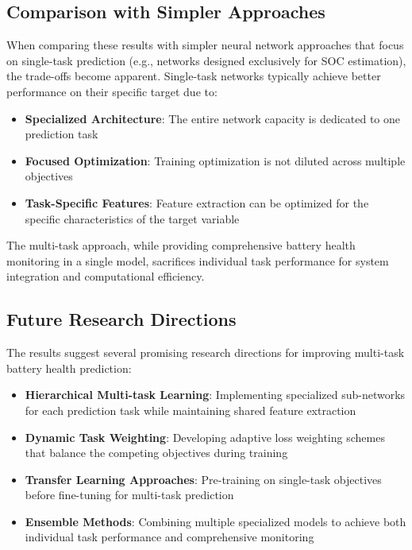 \subsection{Comparison with Simpler Approaches}
\label{subsec:comparison_simpler}

When comparing these results with simpler neural network approaches that focus on single-task prediction (e.g., networks designed exclusively for SOC estimation), the trade-offs become apparent. Single-task networks typically achieve better performance on their specific target due to:

\begin{itemize}
    \item \textbf{Specialized Architecture}: The entire network capacity is dedicated to one prediction task
    \item \textbf{Focused Optimization}: Training optimization is not diluted across multiple objectives
    \item \textbf{Task-Specific Features}: Feature extraction can be optimized for the specific characteristics of the target variable
\end{itemize}

The multi-task approach, while providing comprehensive battery health monitoring in a single model, sacrifices individual task performance for system integration and computational efficiency.

\subsection{Future Research Directions}
\label{subsec:future_directions}

The results suggest several promising research directions for improving multi-task battery health prediction:

\begin{itemize}
    \item \textbf{Hierarchical Multi-task Learning}: Implementing specialized sub-networks for each prediction task while maintaining shared feature extraction
    \item \textbf{Dynamic Task Weighting}: Developing adaptive loss weighting schemes that balance the competing objectives during training
    \item \textbf{Transfer Learning Approaches}: Pre-training on single-task objectives before fine-tuning for multi-task prediction
    \item \textbf{Ensemble Methods}: Combining multiple specialized models to achieve both individual task performance and comprehensive monitoring
\end{itemize}

